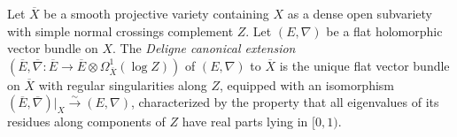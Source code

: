 \begin{definition}
\notready
	   Let $\overline{X}$ be a smooth projective variety containing $X$ as a dense open subvariety with simple normal crossings complement $Z$.
   Let $(E, \nabla)$ be a flat holomorphic vector bundle on $X$. The \emph{Deligne canonical extension}
     $(\overline{E}, \overline{\nabla}: \overline{E}\to \overline{E}\otimes
     \Omega^1_{\overline{X}}(\log Z))$ of $(E, \nabla)$ to $\overline{X}$ is the
     unique flat vector bundle on $\overline{X}$ with regular singularities
     along $Z$, equipped with an isomorphism $(\overline{E},
     \overline{\nabla})|_X\overset{\sim}{\to}(E, \nabla)$, characterized by the
     property that all eigenvalues of its residues
     along components of $Z$
     have real parts lying in $[0,1)$.
\end{definition}

